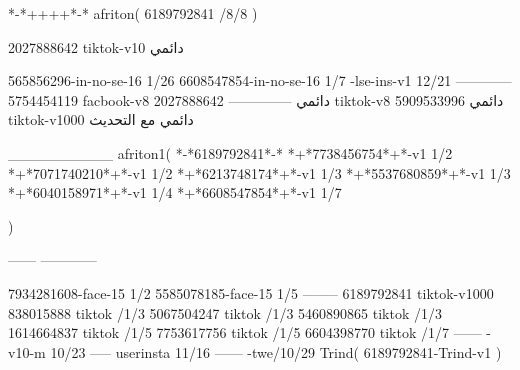 *-*++++*-*
afriton(
6189792841 /8/8
)

2027888642 tiktok-v10
دائمي

565856296-in-no-se-16 1/26
6608547854-in-no-se-16 1/7
-lse-ins-v1 12/21
------------
5754454119 facbook-v8
دائمي
--------------
2027888642 tiktok-v8
دائمي
5909533996 tiktok-v1000
دائمي مع التحديث

__________
afriton1(
*-*6189792841*-*
*+*7738456754*+*-v1 1/2
*+*7071740210*+*-v1 1/2
*+*6213748174*+*-v1 1/3
*+*5537680859*+*-v1 1/3
*+*6040158971*+*-v1 1/4
*+*6608547854*+*-v1 1/7

)

------
------------

7934281608-face-15 1/2
5585078185-face-15 1/5
--------
6189792841 tiktok-v1000
838015888 tiktok /1/3
5067504247 tiktok /1/3
5460890865 tiktok /1/3
1614664837 tiktok /1/5
7753617756 tiktok /1/5
6604398770 tiktok /1/7
------
-v10-m 10/23
-----
userinsta 11/16
------
-twe/10/29
Trind(
6189792841-Trind-v1 
)
